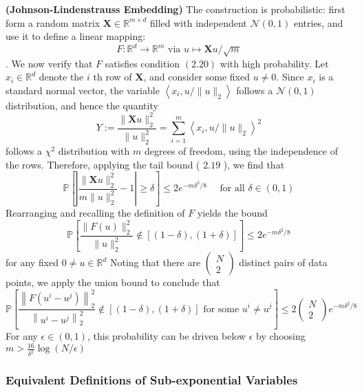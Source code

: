 \documentclass{article}
\newcommand{\bfs}[1]{\textbf{({#1})}}
\begin{document}
\begin{exma}{\bfs{Johnson-Lindenstrauss Embedding}}
The construction is probabilistic: first form a random matrix $\mathbf{X} \in \mathbb{R}^{m \times d}$ filled with independent $\mathcal{N}(0,1)$ entries, and use it to define a linear mapping:
$$F: \mathbb{R}^{d} \rightarrow \mathbb{R}^{m} \text{ via } u \mapsto \mathbf{X} u / \sqrt{m}$$. We now verify that $F$ satisfies condition $(2.20)$ with high probability. Let $x_{i} \in \mathbb{R}^{d}$ denote the $i$ th row of $\mathbf{X}$, and consider some fixed $u \neq 0$. Since $x_{i}$ is a standard normal vector, the variable $\left\langle x_{i}, u /\|u\|_{2}\right\rangle$ follows a $\mathcal{N}(0,1)$ distribution, and hence the quantity
$$
Y:=\frac{\|\mathbf{X} u\|_{2}^{2}}{\|u\|_{2}^{2}}=\sum_{i=1}^{m}\left\langle x_{i}, u /\|u\|_{2}\right\rangle^{2}
$$
follows a $\chi^{2}$ distribution with $m$ degrees of freedom, using the independence of the rows. Therefore, applying the tail bound ( $2.19$ ), we find that
$$
\mathbb{P}\left[\left|\frac{\|\mathbf{X} u\|_{2}^{2}}{m\|u\|_{2}^{2}}-1\right| \geq \delta\right] \leq 2 e^{-m \delta^{2} / 8} \quad \text { for all } \delta \in(0,1)
$$
Rearranging and recalling the definition of $F$ yields the bound
$$
\mathbb{P}\left[\frac{\|F(u)\|_{2}^{2}}{\|u\|_{2}^{2}} \notin[(1-\delta),(1+\delta)]\right] \leq 2 e^{-m \delta^{2} / 8}
$$
for any fixed $0 \neq u \in \mathbb{R}^{d}$
Noting that there are $\left(\begin{array}{c}N \\ 2\end{array}\right)$ distinct pairs of data points, we apply the union bound to conclude that
$$
\mathbb{P}\left[\frac{\left\|F\left(u^{i}-u^{j}\right)\right\|_{2}^{2}}{\left\|u^{i}-u^{j}\right\|_{2}^{2}} \notin[(1-\delta),(1+\delta)] \text { for some } u^{i} \neq u^{j}\right] \leq 2\left(\begin{array}{l}
N \\
2
\end{array}\right) e^{-m \delta^{2} / 8}
$$
For any $\epsilon \in(0,1)$, this probability can be driven below $\epsilon$ by choosing $m>\frac{16}{\delta^{2}} \log (N / \epsilon)$
\end{exma}

\subsubsection{Equivalent Definitions of Sub-exponential Variables}\label{ssec:def_equ_exp}
\end{document}
